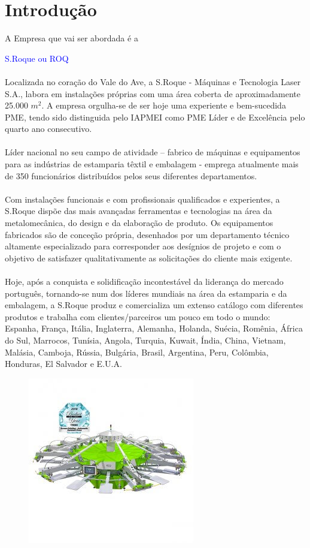 \section{Introdução}
\qquad A Empresa que vai ser abordada é a {\textcolor{blue}{S.Roque ou ROQ} \\
\\
Localizada no coração do Vale do Ave, a S.Roque - Máquinas e Tecnologia Laser S.A., labora em instalações próprias com uma área coberta de aproximadamente 25.000 $m^{2}$. A empresa orgulha-se de ser hoje uma experiente e bem-sucedida PME, tendo sido distinguida pelo IAPMEI como PME Líder e de Excelência pelo quarto ano consecutivo. \\
\\
Líder nacional no seu campo de atividade – fabrico de máquinas e equipamentos para as indústrias de estamparia têxtil e embalagem - emprega atualmente mais de 350 funcionários distribuídos pelos seus diferentes departamentos.\\
\\
Com instalações funcionais e com profissionais qualificados e experientes, a S.Roque dispõe das mais avançadas ferramentas e tecnologias na área da metalomecânica, do design e da elaboração de produto. Os equipamentos fabricados são de conceção própria, desenhados por um departamento técnico altamente especializado para corresponder aos desígnios de projeto e com o objetivo de satisfazer qualitativamente as solicitações do cliente mais exigente.\\
\\
Hoje, após a conquista e solidificação incontestável da liderança do mercado português, tornando-se num dos líderes mundiais na área da estamparia e da embalagem, a S.Roque produz e comercializa um extenso catálogo com diferentes produtos e trabalha com clientes/parceiros um pouco em todo o mundo: Espanha, França, Itália, Inglaterra, Alemanha, Holanda, Suécia, Romênia, África do Sul, Marrocos, Tunísia, Angola, Turquia, Kuwait, Índia, China, Vietnam, Malásia, Camboja, Rússia, Bulgária, Brasil, Argentina, Peru, Colômbia, Honduras, El Salvador e E.U.A.
\begin{figure}[ht]
\begin{center}
\includegraphics[scale=0.5]{"./image/ROQ/maquinas/ECO-P18_600x600-2-275x275.jpg"}

\end{center}
\end{figure}}

